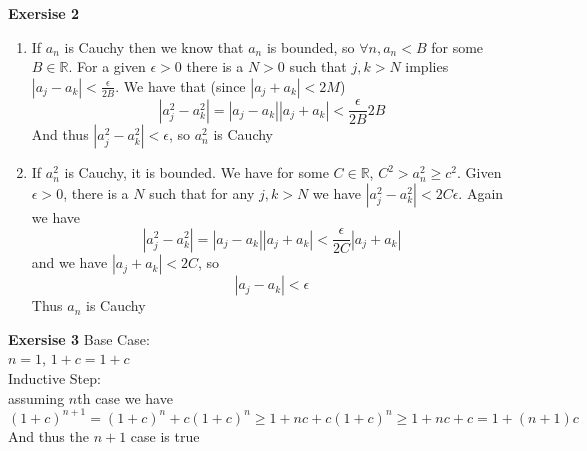 \documentclass[12pt]{article}
\newcounter{ques}[section]
\newenvironment{ques}[1]{\textbf{Exersise #1} \vspace{1mm}}{\medskip}
\theoremstyle{definition}
\begin{document}
\begin{ques}{2}
	\begin{enumerate}
		\item
			If $a_n$ is Cauchy then we know that $a_n$ is bounded,
			so $\forall n, a_n < B$ for some $B \in \mathbb R$. For a given
			$\epsilon >0$ there is a $N >0$ such that $j,k > N$
			implies $|a_j - a_k| < \frac{\epsilon}{ 2B}$. We have
			that (since $|a_j + a_k| < 2M$)
			$$|a_j^2 - a_k^2| = |a_j - a_k||a_j + a_k| <\frac{\epsilon}{ 2B} 2B$$
			And thus $|a_j^2 - a_k^2| < \epsilon$, so $a^2_n$ is Cauchy
		\item
			If $a^2_n$ is Cauchy, it is bounded. We have for
			some $C \in \mathbb R$, $C^2 > a_n^2 \geq c^2$. Given
			$\epsilon > 0$, there is a $N$ such that for any $j,k >
			N$ we have $|a_j^2 - a_k^2| < 2C\epsilon$. Again we
			have 
			$$|a_j^2 - a_k^2| = |a_j - a_k||a_j + a_k| <
			\frac{\epsilon}{2C} |a_j + a_k|$$
			and we have $|a_j + a_k| < 2C$, so 
			$$|a_j - a_k| < \epsilon$$
			Thus $a_n$ is Cauchy

	\end{enumerate}
\end{ques}

\begin{ques}{3}
	Base Case:\\
	$n = 1$, $1 + c = 1 + c$\\
	Inductive Step:\\
	assuming $n$th case we have
	$$(1 + c)^{n+1} = (1 + c)^n + c(1 + c)^n \geq 1 + nc + c(1 + c)^n \geq
	1 + nc + c = 1 + (n+1)c$$
	And thus the $n+1$ case is true
\end{ques}
\end{document}

